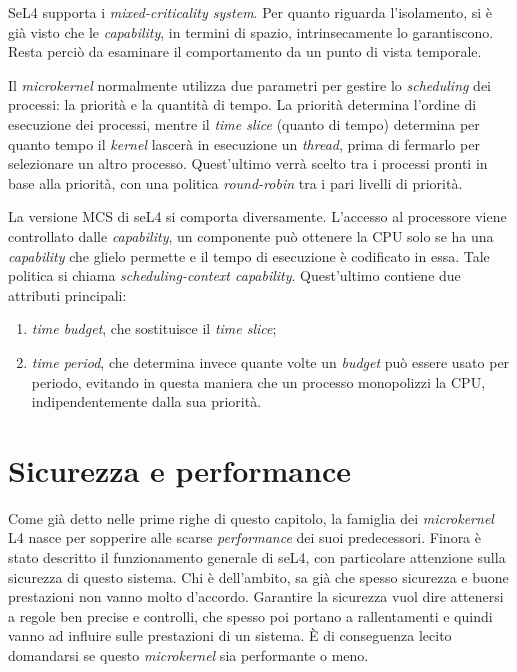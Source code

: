 SeL4 supporta i \textit{mixed-criticality system}. Per quanto riguarda l'isolamento, si è già visto che le \textit{capability}, in termini di spazio, intrinsecamente lo garantiscono. Resta perciò da esaminare il comportamento da un punto di vista temporale.

Il \textit{microkernel} normalmente utilizza due parametri per gestire lo \textit{scheduling} dei processi: la priorità e la quantità di tempo. La priorità determina l'ordine di esecuzione dei processi, mentre il \textit{time slice} (quanto di tempo) determina per quanto tempo il \textit{kernel} lascerà in esecuzione un \textit{thread}, prima di fermarlo per selezionare un altro processo. Quest'ultimo verrà scelto tra i processi pronti in base alla priorità, con una politica \textit{round-robin} tra i pari livelli di priorità.

La versione MCS di seL4 si comporta diversamente. L'accesso al processore viene controllato dalle \textit{capability}, un componente può ottenere la CPU solo se ha una \textit{capability} che glielo permette e il tempo di esecuzione è codificato in essa. Tale politica si chiama \textit{scheduling-context \textit{capability}}. Quest'ultimo contiene due attributi principali: 
\begin{enumerate}
	\item \textit{time budget}, che sostituisce il \textit{time slice};
	\item \textit{time period}, che determina invece quante volte un \textit{budget} può essere usato per periodo, evitando in questa maniera che un processo monopolizzi la CPU, indipendentemente dalla sua priorità.
\end{enumerate}

\section{Sicurezza e performance}
Come già detto nelle prime righe di questo capitolo, la famiglia dei \textit{microkernel} L4 nasce per sopperire alle scarse \textit{performance} dei suoi predecessori. Finora è stato descritto il funzionamento generale di seL4, con particolare attenzione sulla sicurezza di questo sistema. Chi è dell'ambito, sa già che spesso sicurezza e buone prestazioni non vanno molto d'accordo. Garantire la sicurezza vuol dire attenersi a regole ben precise e controlli, che spesso poi portano a rallentamenti e quindi vanno ad influire sulle prestazioni di un sistema. È di conseguenza lecito domandarsi se questo \textit{microkernel} sia performante o meno.

